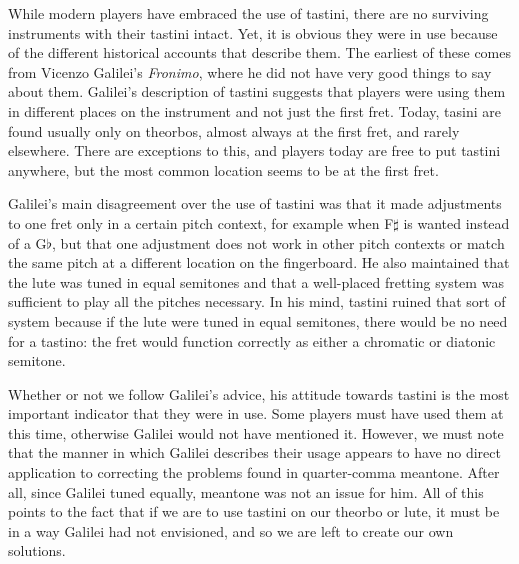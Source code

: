 While modern players have embraced the use of tastini, there are no surviving
instruments with their tastini intact.  Yet, it is obvious they were in use
because of the different historical accounts that describe them.  The earliest
of these comes from Vicenzo Galilei's \textit{Fronimo}, where he did not have
very good things to say about them. Galilei's description of tastini suggests
that players were using them in different places on the instrument and not just
the first fret.\autocite[165]{VG:1} Today, tasini are found usually only
on theorbos, almost always at the first fret, and rarely elsewhere. There are
exceptions to this, and players today are free to put tastini anywhere, but the
most common location seems to be at the first fret.

Galilei's main disagreement over the use of tastini was that it made adjustments to one
fret only in a certain pitch context, for example when F$\sharp$ is wanted instead
of a G$\flat$, but that one adjustment does not work in other pitch contexts or match the
same pitch at a different location on the fingerboard.  He also
maintained that the lute was tuned in equal semitones and that a well-placed fretting system
was sufficient to play all the pitches necessary. In his mind, tastini ruined that sort of system
because if the lute were tuned in equal semitones, there would be no need for
a tastino: the fret would function correctly as either a chromatic or diatonic
semitone.

Whether or not we follow Galilei's advice, his attitude towards tastini is the most
important indicator that they were in use.  Some players must have used them at this
time, otherwise Galilei would not have mentioned it.  However, we must note that the
manner in which Galilei describes their usage appears to have no direct application to
correcting the problems found in quarter-comma meantone.  After all, since Galilei
tuned equally, meantone was not an issue for him.  All of this points to the fact
that if we are to use tastini on our theorbo or lute, it must be in a way Galilei had
not envisioned, and so we are left to create our own solutions.

